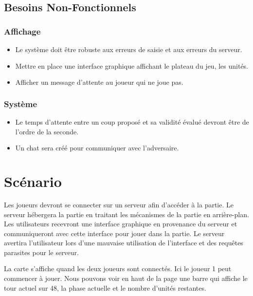 \subsection{Besoins Non-Fonctionnels}

\subsubsection{Affichage}
\begin{itemize}
    \item Le système doit être robuste aux erreurs de saisie et aux erreurs du serveur.
    \item Mettre en place une interface graphique affichant le plateau du jeu, les unités.
    \item Afficher un message d'attente au joueur qui ne joue pas.
\end{itemize}

\subsubsection{Système}
\begin{itemize}
    \item Le temps d'attente entre un coup proposé et sa validité évalué devront être de l'ordre de la seconde.
    \item Un chat sera créé pour communiquer avec l'adversaire.
\end{itemize}

\section{Scénario}

Les joueurs devront se connecter sur un serveur afin d'accéder à la partie. Le serveur hébergera la partie en traitant les mécanismes de la partie en arrière-plan. Les utilisateurs recevront une interface graphique en provenance du serveur et communiqueront avec cette interface pour jouer dans la partie.
Le serveur avertira l'utilisateur lors d'une mauvaise utilisation de l'interface et des requêtes parasites pour le serveur.




La carte s'affiche quand les deux joueurs sont connectés. Ici le joueur 1 peut commencer à jouer.
Nous pouvons voir en haut de la page une barre qui affiche le tour actuel sur 48, la phase actuelle et le nombre d'unités restantes.

